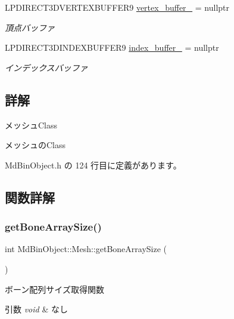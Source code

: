 \begin{DoxyCompactItemize}
L\+P\+D\+I\+R\+E\+C\+T3\+D\+V\+E\+R\+T\+E\+X\+B\+U\+F\+F\+E\+R9 \mbox{\hyperlink{class_md_bin_object_1_1_mesh_a184d71ac41aa259b9af29386f3349380}{vertex\+\_\+buffer\+\_\+}} = nullptr
\begin{DoxyCompactList}\small\item\em 頂点バッファ \end{DoxyCompactList}\item 
L\+P\+D\+I\+R\+E\+C\+T3\+D\+I\+N\+D\+E\+X\+B\+U\+F\+F\+E\+R9 \mbox{\hyperlink{class_md_bin_object_1_1_mesh_a401339a5e426053e9cac2b8d2defaedd}{index\+\_\+buffer\+\_\+}} = nullptr
\begin{DoxyCompactList}\small\item\em インデックスバッファ \end{DoxyCompactList}\end{DoxyCompactItemize}


\subsection{詳解}
メッシュ\+Class 

メッシュの\+Class 

 Md\+Bin\+Object.\+h の 124 行目に定義があります。



\subsection{関数詳解}
\mbox{\label{class_md_bin_object_1_1_mesh_a68046db82ad174df0e993fda7f2bbae1}} 
\subsubsection{\texorpdfstring{get\+Bone\+Array\+Size()}{getBoneArraySize()}}
{\footnotesize\ttfamily int Md\+Bin\+Object\+::\+Mesh\+::get\+Bone\+Array\+Size (\begin{DoxyParamCaption}{ }\end{DoxyParamCaption})}



ボーン配列サイズ取得関数 


\begin{DoxyParams}{引数}
{\em void} & なし \\
\hline
\end{DoxyParams}

